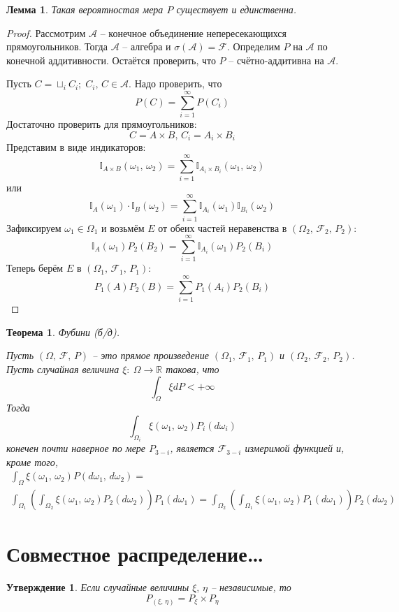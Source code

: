 \documentclass[a4paper,12pt]{article}
\theoremstyle{plain}
\newtheorem{theorem}{Теорема}[section]
\newtheorem{lemma}{Лемма}[section]
\newtheorem{proposition}{Утверждение}[section]
\theoremstyle{definition}
\theoremstyle{remark}
\begin{document}
\begin{lemma}
	Такая вероятностая мера $P$ существует и единственна.
\end{lemma}

\begin{proof}
	Рассмотрим $\mathcal{A}$ -- конечное объединение непересекающихся прямоугольников. Тогда $\mathcal{A}$ -- алгебра и $\sigma(\mathcal{A}) = \mathcal{F}$. Определим $P$ на $\mathcal{A}$ по конечной аддитивности. Остаётся проверить, что $P$ -- счётно-аддитивна на $\mathcal{A}$.

	Пусть $C = \sqcup_i C_i;\; C_i,\,C \in \mathcal{A}$. Надо проверить, что
	\[P(C) = \sum_{i = 1}^\infty P(C_i)\]
	Достаточно проверить для прямоугольников:
	\[C = A \times B,\, C_i = A_i \times B_i\]
	Представим в виде индикаторов:
	\[\mathbb{I}_{A \times B}(\omega_1,\, \omega_2) = \sum_{i = 1}^\infty \mathbb{I}_{A_i \times B_i}(\omega_1,\,\omega_2)\]
	или
	\[\mathbb{I}_A(\omega_1)\cdot\mathbb{I}_B(\omega_2) = \sum_{i = 1}^\infty \mathbb{I}_{A_i}(\omega_1)\mathbb{I}_{B_i}(\omega_2)\]
	Зафиксируем $\omega_1 \in \Omega_1$ и возьмём $E$ от обеих частей неравенства в $(\Omega_2,\, \mathcal{F}_2,\, P_2)$:
	\[\mathbb{I}_A(\omega_1)P_2(B_2) = \sum_{i = 1}^\infty \mathbb{I}_{A_i}(\omega_1)P_2(B_i)\]
	Теперь берём $E$ в $(\Omega_1,\, \mathcal{F}_1,\, P_1)$:
	\[P_1(A)P_2(B) = \sum_{i = 1}^\infty P_1(A_i)P_2(B_i)\]
\end{proof}

\begin{theorem}
	Фубини (б/д).

	Пусть $(\Omega,\, \mathcal{F},\, P)$ -- это прямое произведение $(\Omega_1,\, \mathcal{F}_1,\, P_1)$ и $(\Omega_2,\, \mathcal{F}_2,\, P_2)$. Пусть случайная величина $\xi:\: \Omega \to \mathbb{R}$ такова, что
	\[\int_\Omega \xi dP < +\infty\]
	Тогда
	\[\int_{\Omega_i}\xi(\omega_1,\, \omega_2)P_i(d\omega_i)\]
	конечен почти наверное по мере $P_{3 - i}$, является $\mathcal{F}_{3 - i}$ измеримой функцией и, кроме того,
	\begin{align*}
		\int_\Omega \xi(\omega_1,\, \omega_2)P(d\omega_1,\, d\omega_2) = \\
		\int_{\Omega_1}\left(\int_{\Omega_2}\xi(\omega_1,\, \omega_2)P_2(d\omega_2)\right)P_1(d\omega_1) = \int_{\Omega_2}\left(\int_{\Omega_1}\xi(\omega_1,\, \omega_2)P_1(d\omega_1)\right)P_2(d\omega_2)
	\end{align*}
\end{theorem}

\section{Совместное распределение\dots}
\begin{proposition}
	Если случайные величины $\xi,\,\eta$ -- независимые, то
	\[P_{(\xi,\,\eta)} = P_\xi \times P_\eta\]
\end{proposition}
\end{document}
